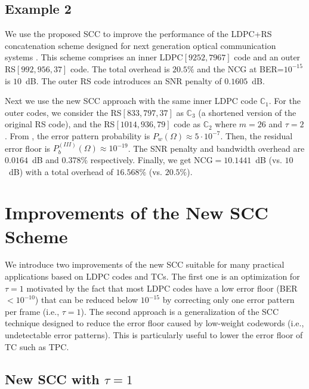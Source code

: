 \documentclass[conference]{IEEEtran}
\newcommand{\C}{\mathbb{C}}  %
\begin{document}
\subsection{Example 2} 
We use the proposed SCC to improve the performance of the LDPC+RS
concatenation scheme designed for next generation optical
communication systems \cite{4528592}. This scheme comprises an inner
LDPC$[9252,7967]$ code and an outer RS$[992,956,37]$ code. The total
overhead is $20.5\%$ and the NCG at BER=$10^{-15}$ is $10$~dB. The
outer RS code introduces an SNR penalty of $0.1605$~dB.

Next we use the new SCC approach with the same inner LDPC code
$\C_1$. For the outer codes, we consider the RS$[833,797,37]$ as
$\C_3$ (a shortened version of the original RS code), and the
RS$[1014,936,79]$ code as $\C_2$ where $m=26$ and $\tau=2$.  From
\cite{4528592}, the error pattern probability is $P_w(\Omega)\approx
5\cdot 10^{-7}$. Then, the residual error floor is
$P_b^{(I\!I\!I)}(\Omega)\approx 10^{-19}$. The SNR penalty and
bandwidth overhead are $0.0164$~dB and $0.378\%$
respectively. Finally, we get NCG$=10.1441$~dB (vs. $10$~dB) with a
total overhead of $16.568\%$ (vs. $20.5\%$).


\section{Improvements of the New SCC Scheme} \label{sec:improvements}

We introduce two improvements of the new SCC suitable for many
practical applications based on LDPC codes and TCs. The first one is
an optimization for $\tau=1$ motivated by the fact that most LDPC
codes have a low error floor (BER$<10^{-10}$) that can be reduced
below $10^{-15}$ by correcting only one error pattern per frame (i.e.,
$\tau=1$). The second approach is a generalization of the SCC
technique designed to reduce the error floor caused by low-weight
codewords (i.e., undetectable error patterns). This is particularly
useful to lower the error floor of TC such as TPC.

\subsection{New SCC with $\tau=1$} \label{sec:improvement_1}
\end{document}
